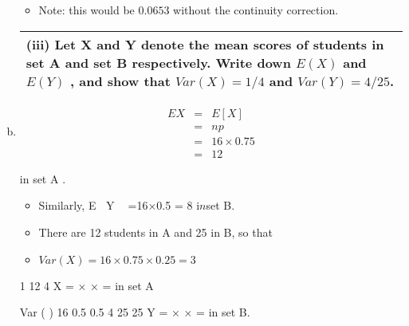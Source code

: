\documentclass[a4paper,12pt]{article}
\begin{document}
\begin{enumerate}[(a)]
\begin{itemize}
\item Note: this would be $0.0653$ without the continuity correction.
\end{itemize}
\newpage

\begin{table}[ht!]
\centering
\begin{tabular}{|p{15cm}|}
\hline
\noindent (iii) Let X and Y denote the mean scores of students in set A and set B
respectively. Write down $E(X)$ and $E(Y)$ , and show that
$Var(X ) =1/ 4$ and $Var(Y ) = 4/ 25$.
\\ \hline
\end{tabular}
\end{table}
\item 
\begin{eqnarray*}
E X  &=& E[X ] \\
&=& np \\
&=& 16\times 0.75 \\
&=& 12 
\end{eqnarray*}

in set A .

\begin{itemize}
\item Similarly, E Y  =16×0.5 = 8 i$n$set B.
\item There are 12 students in A and 25 in B, so that
\item $Var (X)  = 16 \times 0.75 \times 0.25 = 3$
  \end{itemize}

1
12 4
X = × × = in set A

Var ( ) 16 0.5 0.5 4
25 25
Y = × × = in set B.

\end{enumerate}
\end{document}
